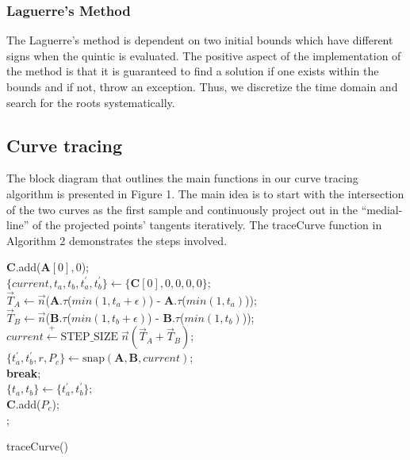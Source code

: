 \documentclass[journal, letterpaper]{IEEEtran}
\begin{document}
\subsubsection{Laguerre's Method}
The Laguerre's method is dependent on two initial bounds which have different signs when the 
quintic is evaluated. The positive aspect of the implementation of the method is that it is guaranteed to find a solution
if one exists within the bounds and if not, throw an exception. Thus, we discretize the
time domain and search for the roots systematically. 

\subsection{Curve tracing}

The block diagram that outlines the main functions in our curve tracing algorithm is presented in Figure 1.
The main idea is to start with the intersection of the two curves as the first sample and continuously project
out in the ``medial-line'' of the projected points' tangents iteratively. The traceCurve function in Algorithm 2
demonstrates the steps involved. 

\begin{algorithm}[ht!]
  $\mathbf{C}.$add($\mathbf{A}[0], 0$); \\
  $\{current, t_a, t_b, t_a^\prime, t_b^\prime\} \leftarrow \{\mathbf{C}[0],0,0,0,0\}$; \\
   {
  $\vec{T}_A \leftarrow \vec{n}$($\mathbf{A}.\tau$($min(1,t_a+\epsilon)$) - $\mathbf{A}.\tau$($min(1,t_a)$)); \\
  $\vec{T}_B \leftarrow \vec{n}$($\mathbf{B}.\tau$($min(1,t_b+\epsilon)$) - $\mathbf{B}.\tau$($min(1,t_b)$)); \\
  $current \stackrel{+}\leftarrow \text{STEP\_SIZE} \;\vec{n}(\vec{T}_A + \vec{T}_B)$; \\
  $\{t_a^\prime, t_b^\prime, r, P_c\} \leftarrow \text{snap}(\mathbf{A},\mathbf{B},current)$; \\
   \textbf{break}; \\
  $\{t_a, t_b\} \leftarrow \{t_a^\prime, t_b^\prime\};$ \\
  $\mathbf{C}.$add($P_c$); \\
  }
  ;
  \caption{traceCurve()}
\end{algorithm}
\end{document}
